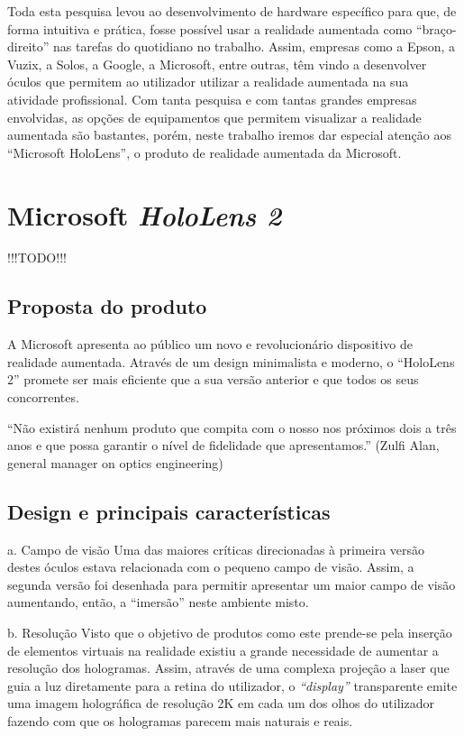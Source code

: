 \documentclass{report}
\begin{document}
Toda esta pesquisa levou ao desenvolvimento de hardware específico para que, de forma intuitiva e prática, fosse possível usar a realidade aumentada como “braço-direito” nas tarefas do quotidiano no trabalho. Assim, empresas como a Epson, a Vuzix, a Solos, a Google, a Microsoft, entre outras, têm vindo a desenvolver óculos que permitem ao utilizador utilizar a realidade aumentada na sua atividade profissional. Com tanta pesquisa e com tantas grandes empresas envolvidas, as opções de equipamentos que permitem visualizar a realidade aumentada são bastantes, porém, neste trabalho iremos dar especial atenção aos “Microsoft HoloLens”, o produto de realidade aumentada da Microsoft.

\chapter{Microsoft \textit{HoloLens 2}}
\label{chap.microsoft-hololens-2}
!!!TODO!!!

\section{Proposta do produto}
A Microsoft apresenta ao público um novo e revolucionário dispositivo de realidade aumentada. Através de um design minimalista e moderno, o “HoloLens 2” promete ser mais eficiente que a sua versão anterior e que todos os seus concorrentes.

“Não existirá nenhum produto que compita com o nosso nos próximos dois a três anos e que possa garantir o nível de fidelidade que apresentamos.” (Zulfi Alan, general manager on optics engineering)

\section{Design e principais características}
a. Campo de visão
Uma das maiores críticas direcionadas à primeira versão destes óculos estava relacionada com o pequeno campo de visão. Assim, a segunda versão foi desenhada para permitir apresentar um maior campo de visão aumentando, então, a “imersão” neste ambiente misto.

b. Resolução
Visto que o objetivo de produtos como este prende-se pela inserção de elementos virtuais na realidade existiu a grande necessidade de aumentar a resolução dos hologramas. Assim, através de uma complexa projeção a laser que guia a luz diretamente para a retina do utilizador, o \textit{“display”} transparente emite uma imagem holográfica de resolução 2K em cada um dos olhos do utilizador fazendo com que os hologramas parecem mais naturais e reais.
\end{document}
